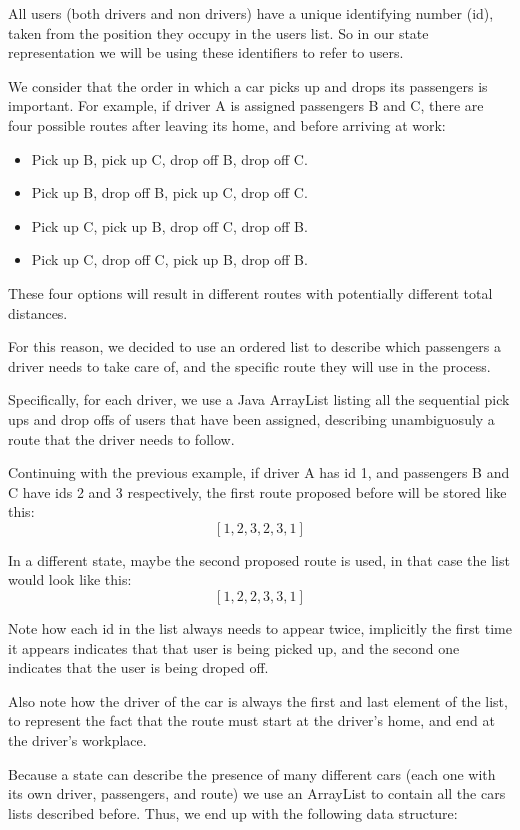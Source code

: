 \documentclass[12]{article}
\begin{document}
All users (both drivers and non drivers) have a unique identifying number (id), taken from the position they occupy in the users list.
So in our state representation we will be using these identifiers to refer to users.

We consider that the order in which a car picks up and drops its passengers is important. For example, if driver A is assigned passengers B and C, there are four possible routes after leaving its home, and before arriving at work:

\begin{itemize}
	\item Pick up B, pick up C, drop off B, drop off C.
	\item Pick up B, drop off B, pick up C, drop off C.
    \item Pick up C, pick up B, drop off C, drop off B.
    \item Pick up C, drop off C, pick up B, drop off B.
\end{itemize}

These four options will result in different routes with potentially different total distances.

For this reason, we decided to use an ordered list to describe which passengers a driver needs to take care of, and the specific route they will use in the process.

Specifically, for each driver, we use a Java ArrayList listing all the sequential pick ups and drop offs of users that have been assigned, describing unambiguosuly a route that the driver needs to follow.

Continuing with the previous example, if driver A has id 1, and passengers B and C have ids 2 and 3 respectively, the first route proposed before will be stored like this: $$[1, 2, 3, 2, 3, 1]$$

In a different state, maybe the second proposed route is used, in that case the list would look like this: $$[1, 2, 2, 3, 3, 1]$$

Note how each id in the list always needs to appear twice, implicitly the first time it appears indicates that that user is being picked up, and the second one indicates that the user is being droped off.

Also note how the driver of the car is always the first and last element of the list, to represent the fact that the route must start at the driver's home, and end at the driver's workplace.

Because a state can describe the presence of many different cars (each one with its own driver, passengers, and route) we use an ArrayList to contain all the cars lists described before. Thus, we end up with the following data structure:
\end{document}

